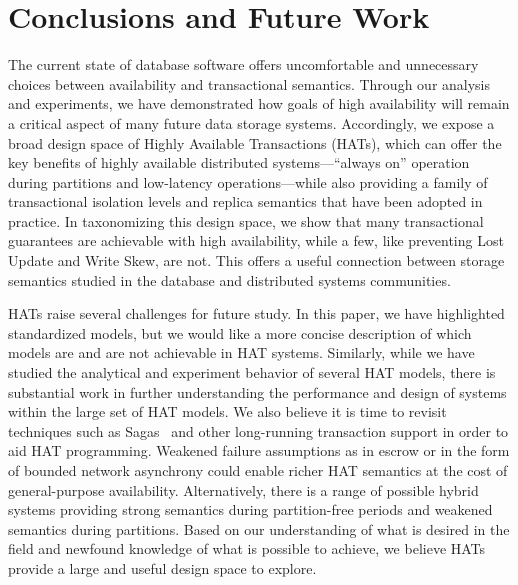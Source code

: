 
\section{Conclusions and Future Work}
\label{sec:conclusion}

The current state of database software offers uncomfortable and
unnecessary choices between availability and transactional semantics.
Through our analysis and experiments, we have demonstrated how goals
of high availability will remain a critical aspect of many future data
storage systems. Accordingly, we expose a broad design space of Highly
Available Transactions (HATs), which can offer the key benefits of
highly available distributed systems---``always on'' operation during
partitions and low-latency operations---while also providing a family
of transactional isolation levels and replica semantics that have been
adopted in practice.  In taxonomizing this design space, we show that
many transactional guarantees are achievable with high availability,
while a few, like preventing Lost Update and Write Skew, are not. This
offers a useful connection between storage semantics studied in the
database and distributed systems communities.

HATs raise several challenges for future study. In this paper, we have
highlighted standardized models, but we would like a more concise
description of which models are and are not achievable in HAT
systems. Similarly, while we have studied the analytical and
experiment behavior of several HAT models, there is substantial work
in further understanding the performance and design of systems within
the large set of HAT models. We also believe it is time to revisit
techniques such as Sagas~\cite{sagas} and other long-running
transaction support in order to aid HAT programming. Weakened failure
assumptions as in escrow or in the form of bounded network asynchrony
could enable richer HAT semantics at the cost of general-purpose
availability. Alternatively, there is a range of possible hybrid
systems providing strong semantics during partition-free periods and
weakened semantics during partitions. Based on our understanding of
what is desired in the field and newfound knowledge of what is
possible to achieve, we believe HATs provide a large and useful design
space to explore.


